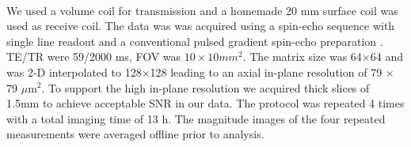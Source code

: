 \paragraph{}
We used a volume coil for transmission and a homemade 20 mm surface coil was used as receive coil. The data was was acquired using a spin-echo sequence with single line readout and a conventional pulsed gradient spin-echo preparation \citep{Stejskal:1965}.  TE/TR were 59/2000 ms, \gls{FOV} was $10\times 10 mm^2$. The matrix size was 64$\times$64 and was 2-D interpolated to 128$\times$128 leading to an axial in-plane resolution of 79 $\times$ 79 $\mu$m$^2$. To support the high in-plane resolution we acquired thick slices of 1.5mm to achieve acceptable \gls{SNR} in our data. The protocol was repeated 4 times with a total imaging time of 13 h. The magnitude images of the four repeated measurements were averaged offline prior to analysis.
